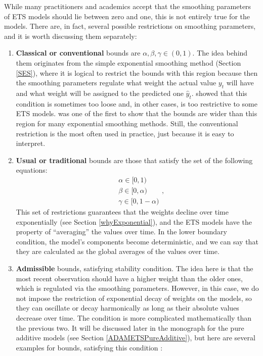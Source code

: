 \documentclass[
]{book}
\theoremstyle{definition}
\theoremstyle{definition}
\theoremstyle{definition}
\theoremstyle{definition}
\theoremstyle{remark}
\begin{document}
While many practitioners and academics accept that the smoothing parameters of ETS models should lie between zero and one, this is not entirely true for the models. There are, in fact, several possible restrictions on smoothing parameters, and it is worth discussing them separately:

\begin{enumerate}
\def\labelenumi{\arabic{enumi}.}
\item
  \textbf{Classical or conventional} bounds are \(\alpha, \beta, \gamma \in (0,1)\). The idea behind them originates from the simple exponential smoothing method (Section \ref{SES}), where it is logical to restrict the bounds with this region because then the smoothing parameters regulate what weight the actual value \(y_t\) will have and what weight will be assigned to the predicted one \(\hat{y}_t\). \citet{Hyndman2008b} showed that this condition is sometimes too loose and, in other cases, is too restrictive to some ETS models. \citet{Brenner1968} was one of the first to show that the bounds are wider than this region for many exponential smoothing methods. Still, the conventional restriction is the most often used in practice, just because it is easy to interpret.
\item
  \textbf{Usual or traditional} bounds are those that satisfy the set of the following equations:
  \begin{equation}
    \begin{aligned}
    &\alpha \in [0, 1)\\
    &\beta \in [0, \alpha) \\
    &\gamma \in [0, 1-\alpha)
    \end{aligned},
    \label{eq:ETSUsualBounds}
  \end{equation}
  This set of restrictions guarantees that the weights decline over time exponentially (see Section \ref{whyExponential}), and the ETS models have the property of ``averaging'' the values over time. In the lower boundary condition, the model's components become deterministic, and we can say that they are calculated as the global averages of the values over time.
\item
  \textbf{Admissible} bounds, satisfying stability condition. The idea here is that the most recent observation should have a higher weight than the older ones, which is regulated via the smoothing parameters. However, in this case, we do not impose the restriction of exponential decay of weights on the models, so they can oscillate or decay harmonically as long as their absolute values decrease over time. The condition is more complicated mathematically than the previous two. It will be discussed later in the monograph for the pure additive models (see Section \ref{ADAMETSPureAdditive}), but here are several examples for bounds, satisfying this condition \citep[from Chapter 10 of][]{Hyndman2008b}:
\end{enumerate}
\end{document}
